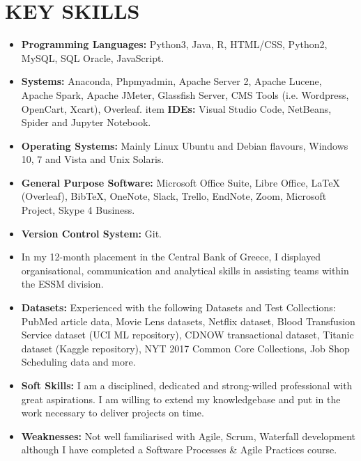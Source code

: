 \documentclass[11pt,a4paper,roman]{moderncv}
\begin{document}
\section{KEY SKILLS}
\begin{itemize}
    \item \textbf{Programming Languages:} Python3, Java, R, HTML/CSS, Python2, MySQL, SQL Oracle, JavaScript.
    \item \textbf{Systems:} Anaconda, Phpmyadmin, Apache Server 2, Apache Lucene, Apache Spark, Apache JMeter, Glassfish Server, CMS Tools (i.e. Wordpress, OpenCart, Xcart), Overleaf.
    item \textbf{IDEs:} Visual Studio Code, NetBeans, Spider and Jupyter Notebook. 
    \item \textbf{Operating Systems:} Mainly Linux Ubuntu and Debian flavours, Windows 10, 7 and Vista and Unix Solaris.
    \item \textbf{General Purpose Software:} Microsoft Office Suite, Libre Office, LaTeX (Overleaf), BibTeX, OneNote, Slack, Trello, EndNote, Zoom, Microsoft Project, Skype 4 Business.
    \item \textbf{Version Control System: } Git.
    \item In my 12-month placement in the Central Bank of Greece, I displayed organisational, communication and analytical skills in assisting teams within the ESSM division.
    \item \textbf{Datasets:} Experienced with the following Datasets and Test Collections: PubMed article data, Movie Lens datasets, Netflix dataset, Blood Transfusion Service dataset (UCI ML repository), CDNOW transactional dataset, Titanic dataset (Kaggle repository), NYT 2017 Common Core Collections, Job Shop Scheduling data and more.
    \item \textbf{Soft Skills:} I am a disciplined, dedicated and strong-willed professional with great aspirations. I am willing to extend my knowledgebase and put in the work necessary to deliver projects on time. 
    \item \textbf{Weaknesses:} Not well familiarised with Agile, Scrum, Waterfall development although I have completed a Software Processes & Agile Practices course.
\end{itemize}
\end{document}
